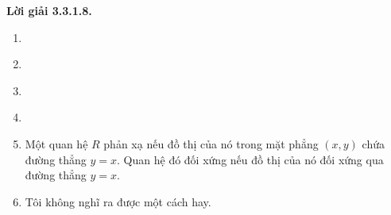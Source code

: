 \noindent\textbf{Lời giải 3.3.1.8.}\keepwithnext
\providecommand{\ctIIIparabolagrid}{\foreach \x in {-4,...,4}{\draw[thin] (\x,-5)--(\x,20);\node[below,font=\scriptsize]at(\x,-5){$\x$};}\foreach\y in{-5,0,5,10,15,20}{\draw[thin](-4,\y)--(4,\y);\node[left,font=\scriptsize]at(-4,\y){$\y$};}}
\providecommand{\ctIIIsquaregrid}{\foreach \x in {-4,...,4}{\draw[thin](\x,-5)--(\x,5);\node[below,font=\scriptsize]at(\x,-5){$\x$};}\foreach\y in{-5,...,5}{\draw[thin](-4,\y)--(4,\y);\node[left,font=\scriptsize]at(-4,\y){$\y$};}}
\begin{enumerate}[label=\alph*.]
\item
\begin{center}\end{center}
\item
\begin{center}\end{center}
\item
\begin{center}\end{center}
\item
\begin{center}\end{center}
\item Một quan hệ $R$ phản xạ nếu đồ thị của nó trong mặt phẳng $(x,y)$ chứa đường thẳng $y=x$. Quan hệ đó đối xứng nếu đồ thị của nó đối xứng qua đường thẳng $y=x$.
\item Tôi không nghĩ ra được một cách hay.
\end{enumerate}

